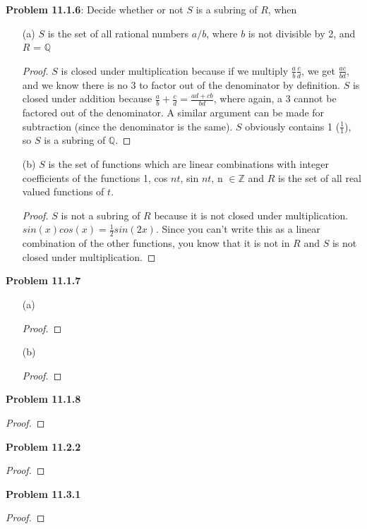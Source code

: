 \documentclass[12pt]{article}
\begin{document}
\textbf{Problem 11.1.6}: Decide whether or not $S$ is a subring of $R$, when
\begin{enumerate}
  \item[(a)] $S$ is the set of all rational numbers $a/b$, where $b$ is not divisible by 2, and $R$ = $\mathbb{Q}$
  \begin{proof}
    $S$ is closed under multiplication because if we multiply $\frac{a}{b}\frac{c}{d}$, we get $\frac{ac}{bd}$, and we know there is no 3 to factor out of the denominator by definition. $S$ is closed under addition because $\frac{a}{b} + \frac{c}{d} = \frac{ad + cb}{bd}$, where again, a 3 cannot be factored out of the denominator. A similar argument can be made for subtraction (since the denominator is the same). $S$ obviously contains 1 ($\frac{1}{1}$), so $S$ is a subring of $\mathbb{Q}$.
  \end{proof}
  \item[(b)] $S$ is the set of functions which are linear combinations with integer coefficients of the functions {1, cos $nt$, sin $nt$}, n $\in \mathbb{Z}$ and $R$ is the set of all real valued functions of $t$.
  \begin{proof}
    $S$ is not a subring of $R$ because it is not closed under multiplication. $sin(x)cos(x) = \frac{1}{2}sin(2x)$. Since you can't write this as a linear combination of the other functions, you know that it is not in $R$ and $S$ is not closed under multiplication.
  \end{proof}
\end{enumerate}

\textbf{Problem 11.1.7}
\begin{enumerate}
  \item[(a)]
  \begin{proof}
  \end{proof}
  \item[(b)]
  \begin{proof}
  \end{proof}
\end{enumerate}

\textbf{Problem 11.1.8}
\begin{proof}

\end{proof}

\textbf{Problem 11.2.2}
\begin{proof}

\end{proof}

\textbf{Problem 11.3.1}
\begin{proof}

\end{proof}
\end{document}
